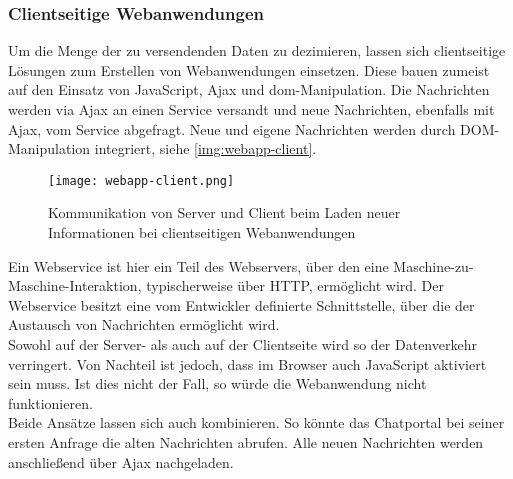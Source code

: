 \subsubsection{Clientseitige Webanwendungen}
\label{sec:client-webanwendung}

Um die Menge der zu versendenden Daten zu dezimieren, lassen sich clientseitige Lösungen zum Erstellen von Webanwendungen einsetzen. Diese bauen zumeist auf den Einsatz von JavaScript, Ajax und \ac{dom}-Manipulation. Die Nachrichten werden via Ajax an einen Service versandt und neue Nachrichten, ebenfalls mit Ajax, vom Service abgefragt. Neue und eigene Nachrichten werden durch DOM-Manipulation integriert, siehe \autoref{img:webapp-client}. 

\begin{figure}[H]
	\begin{center}
		\texttt{[image: webapp-client.png]}
		\caption{Kommunikation von Server und Client beim Laden neuer Informationen bei clientseitigen Webanwendungen}
		\label{img:webapp-client}
	\end{center}
\end{figure}

Ein Webservice ist hier ein Teil des Webservers, über den eine Maschine-zu-Maschine-Interaktion, typischerweise über HTTP, ermöglicht wird. Der Webservice besitzt eine vom Entwickler definierte Schnittstelle, über die der Austausch von Nachrichten ermöglicht wird.\\
Sowohl auf der Server- als auch auf der Clientseite wird so der Datenverkehr verringert. Von Nachteil ist jedoch, dass im Browser auch JavaScript aktiviert sein muss. Ist dies nicht der Fall, so würde die Webanwendung nicht funktionieren. \\
Beide Ansätze lassen sich auch kombinieren. So könnte das Chatportal bei seiner ersten Anfrage die alten Nachrichten abrufen. Alle neuen Nachrichten werden anschließend über Ajax nachgeladen.